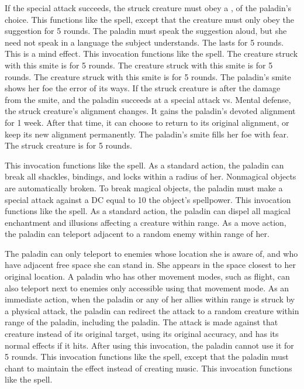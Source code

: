 If the special attack succeeds, the struck creature must obey a , of the paladin's choice.
This functions like the  spell, except that the creature must only obey the suggestion for 5 rounds.
The paladin must speak the suggestion aloud, but she need not speak in a language the subject understands.
The  lasts for 5 rounds.
This is a mind effect.
 This invocation functions like the  spell.
The creature struck with this smite is \disoriented for 5 rounds.
The creature struck with this smite is \staggered for 5 rounds.
The creature struck with this smite is \immobilized for 5 rounds.
The paladin's smite shows her foe the error of its ways.
If the struck creature is \bloodied after the damage from the smite, and the paladin succeeds at a special attack vs. Mental defense, the struck creature's alignment changes.
It gains the paladin's devoted alignment for 1 week.
After that time, it can choose to return to its original alignment, or keep its new alignment permanently.
The paladin's smite fills her foe with fear.
The struck creature is \frightened for 5 rounds.

 This invocation functions like the 
spell.
As a standard action, the paladin can break all shackles, bindings, and locks within a \arealarge radius of her.
Nonmagical objects are automatically broken.
To break magical objects, the paladin must make a special attack against a DC equal to 10 \add the object's spellpower.
 This invocation functions like the  spell.
As a standard action, the paladin can dispel all magical enchantment and illusions affecting a creature within \rngmed range.
As a move action, the paladin can teleport adjacent to a random enemy within \rngmed range of her.

The paladin can only teleport to enemies whose location she is aware of, and who have adjacent free space she can stand in.
She appears in the space closest to her original location.
A paladin who has other movement modes, such as flight, can also teleport next to enemies only accessible using that movement mode.
As an immediate action, when the paladin or any of her allies within \rngclose range is struck by a physical attack, the paladin can redirect the attack to a random creature within \rngclose range of the paladin, including the paladin.
The attack is made against that creature instead of its original target, using its original accuracy, and has its normal effects if it hits.
After using this invocation, the paladin cannot use it for 5 rounds.
 This invocation functions like the 
spell, except that the paladin must chant to maintain the effect instead of creating music.
 This invocation functions like the 
spell.

